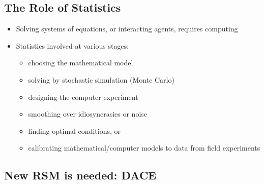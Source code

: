 \documentclass[
  letterpaper,
  DIV=11,
  numbers=noendperiod]{scrreprt}
\providecommand{\tightlist}{%
  \setlength{\itemsep}{0pt}\setlength{\parskip}{0pt}}\usepackage{longtable,booktabs,array}
\begin{document}
\hypertarget{the-role-of-statistics}{%
\subsection{The Role of Statistics}\label{the-role-of-statistics}}

\begin{itemize}
\tightlist
\item
  Solving systems of equations, or interacting agents, requires
  computing
\item
  Statistics involved at various stages:

  \begin{itemize}
  \tightlist
  \item
    choosing the mathematical model
  \item
    solving by stochastic simulation (Monte Carlo)
  \item
    designing the computer experiment
  \item
    smoothing over idiosyncrasies or noise
  \item
    finding optimal conditions, or
  \item
    calibrating mathematical/computer models to data from field
    experiments
  \end{itemize}
\end{itemize}

\hypertarget{new-rsm-is-needed-dace}{%
\subsection{New RSM is needed: DACE}\label{new-rsm-is-needed-dace}}
\end{document}
